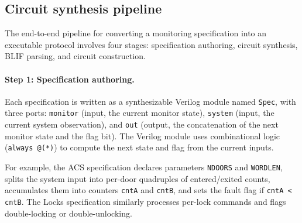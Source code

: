 \subsection{Circuit synthesis pipeline}\label{sec:pipeline}

The end-to-end pipeline for converting a monitoring specification into an executable protocol involves four stages: specification authoring, circuit synthesis, BLIF parsing, and circuit construction.

\paragraph{Step 1: Specification authoring.}
Each specification is written as a synthesizable Verilog module named \texttt{Spec}, with three ports: \texttt{monitor} (input, the current monitor state), \texttt{system} (input, the current system observation), and \texttt{out} (output, the concatenation of the next monitor state and the flag bit). The Verilog module uses combinational logic (\texttt{always @(*)}) to compute the next state and flag from the current inputs.

For example, the ACS specification declares parameters \texttt{NDOORS} and \texttt{WORDLEN}, splits the system input into per-door quadruples of entered/exited counts, accumulates them into counters \texttt{cntA} and \texttt{cntB}, and sets the fault flag if \texttt{cntA < cntB}. The Locks specification similarly processes per-lock commands and flags double-locking or double-unlocking.

